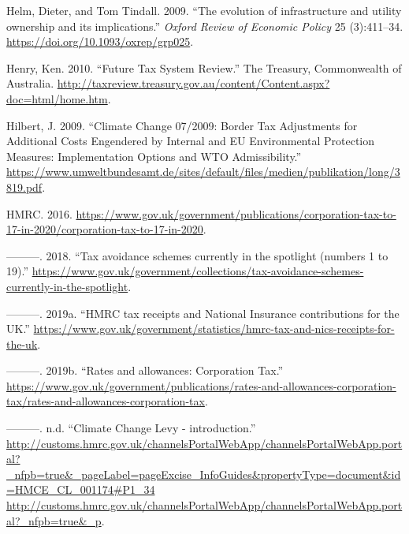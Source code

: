 \documentclass[]{tufte-handout}
\begin{document}
\leavevmode\hypertarget{ref-Helm2009}{}%
Helm, Dieter, and Tom Tindall. 2009. ``The evolution of infrastructure
and utility ownership and its implications.'' \emph{Oxford Review of
Economic Policy} 25 (3):411--34.
\url{https://doi.org/10.1093/oxrep/grp025}.

\leavevmode\hypertarget{ref-Henry2010}{}%
Henry, Ken. 2010. ``Future Tax System Review.'' The Treasury,
Commonwealth of Australia.
\url{http://taxreview.treasury.gov.au/content/Content.aspx?doc=html/home.htm}.

\leavevmode\hypertarget{ref-Hilbert2009}{}%
Hilbert, J. 2009. ``Climate Change 07/2009: Border Tax Adjustments for
Additional Costs Engendered by Internal and EU Environmental Protection
Measures: Implementation Options and WTO Admissibility.''
\url{https://www.umweltbundesamt.de/sites/default/files/medien/publikation/long/3819.pdf}.

\leavevmode\hypertarget{ref-HMRC2015}{}%
HMRC. 2016.
\url{https://www.gov.uk/government/publications/corporation-tax-to-17-in-2020/corporation-tax-to-17-in-2020}.

\leavevmode\hypertarget{ref-HMRC2018b}{}%
---------. 2018. ``Tax avoidance schemes currently in the spotlight
(numbers 1 to 19).''
\url{https://www.gov.uk/government/collections/tax-avoidance-schemes-currently-in-the-spotlight}.

\leavevmode\hypertarget{ref-HMRC2019}{}%
---------. 2019a. ``HMRC tax receipts and National Insurance
contributions for the UK.''
\url{https://www.gov.uk/government/statistics/hmrc-tax-and-nics-receipts-for-the-uk}.

\leavevmode\hypertarget{ref-HMRC2019a}{}%
---------. 2019b. ``Rates and allowances: Corporation Tax.''
\url{https://www.gov.uk/government/publications/rates-and-allowances-corporation-tax/rates-and-allowances-corporation-tax}.

\leavevmode\hypertarget{ref-HMRC}{}%
---------. n.d. ``Climate Change Levy - introduction.''
\href{http://customs.hmrc.gov.uk/channelsPortalWebApp/channelsPortalWebApp.portal?_nfpb=true\&_pageLabel=pageExcise_InfoGuides\&propertyType=document\&id=HMCE_CL_001174\#P1_34\%20http://customs.hmrc.gov.uk/channelsPortalWebApp/channelsPortalWebApp.portal?_nfpb=true\&_p}{http://customs.hmrc.gov.uk/channelsPortalWebApp/channelsPortalWebApp.portal?\_nfpb=true\&\_pageLabel=pageExcise\_InfoGuides\&propertyType=document\&id=HMCE\_CL\_001174\#P1\_34 http://customs.hmrc.gov.uk/channelsPortalWebApp/channelsPortalWebApp.portal?\_nfpb=true\&\_p}.
\end{document}

